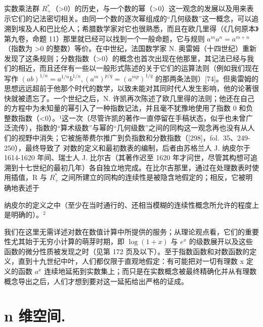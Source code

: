 实数乘法群 \(R_{+}^{*}\)（\textgreater0）的历史，与一个数的幂（\textgreater0）这一观念的发展以及用来表示它们的记法密切相关。由同一个数的逐次幂组成的“几何级数”这一概念，可以追溯到埃及人和巴比伦人；希腊数学家对它也很熟悉，而且在欧几里得（《几何原本》第九卷，命题 11）那里就已经可以找到一个一般命题，它与规则 \(a^{m}a^{n}=a^{m+n}\)（指数为 \textgreater0 的整数）等价。在中世纪，法国数学家 N. 奥雷姆（十四世纪）重新发现了这条规则；分数指数（\textgreater0）的概念也首次出现在他那里，其记法已经与我们的相近，而且还伴有一些以一般形式陈述的关于它们的运算法则（例如我们现在写作 \((ab)^{1/n}=a^{1/n}b^{1/n},(a^{m})^{p/q}=(a^{mp})^{1/q}\) 的那两条法则）{[}74{]}。但奥雷姆的思想远远超前于他那个时代的数学，以致未能对其同时代人发生影响，他的论著很快就被遗忘了。一个世纪之后，N. 许凯再次陈述了欧几里得的法则；他还在自己的方程中为未知量的幂引入了一种指数记法，并且毫不犹豫地使用了指数 0 和负整数指数（\textless0）。¹这一次（尽管许凯的著作一直停留在手稿状态，似乎也未曾广泛流传），指数的“算术级数”与幂的“几何级数”之间的同构这一观念再也没有从人们的视野中消失；它被施蒂费尔推广到负指数和分数指数（{[}298{]}，fol.~35、249-250），最终导致了 对数的定义和最初数表的编制，后者由苏格兰人 J. 纳皮尔于 1614-1620 年间、瑞士人 J. 比尔吉（其著作迟至 1620 年才问世，尽管其构想可追溯到十七世纪的最初几年）各自独立地完成。在比尔吉那里，通过在处理数表时使用插值，R 与 \(R_{+}^{*}\) 之间所建立的同构的连续性是被隐含地假定的；相反，它被明确地表述于

纳皮尔的定义之中（至少在当时通行的、还相当模糊的连续性概念所允许的程度上是明确的）。\(^{2}\)

我们在这里无需详述对数在数值计算中所提供的服务；从理论观点看，它们的重要性尤其始于无穷小计算的萌芽时期，即 \(\log(1+x)\) 与 \(e^{x}\) 的级数展开以及这些函数的微分性质被发现之时（见第 172 页及以下）。至于指数函数和对数函数的定义，直到十九世纪中叶，人们都仅限于直观地假定：有可能把对一切有理数 x 定义的函数 \(a^{x}\) 连续地延拓到实数集上；而只是在实数概念被最终精确化并从有理数概念导出之后，人们才想到要对这一延拓给出严格的证成。

\chapter{n 维空间.}

